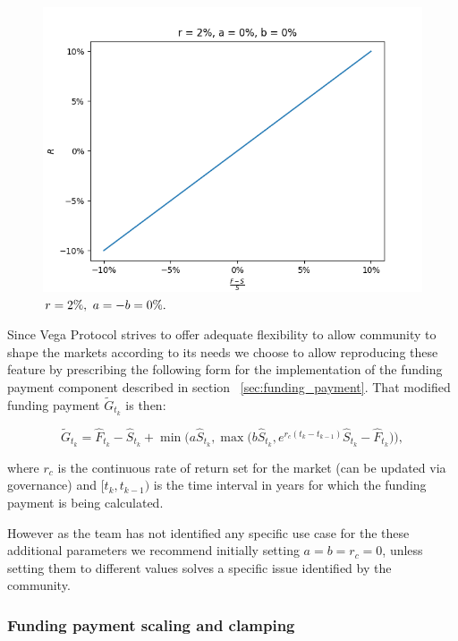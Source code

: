 \documentclass[10pt]{article}
\begin{document}
\begin{figure}[!htb]
  \includegraphics[width=\linewidth]{./plots/r_0.02_a_0_b_0_c_inf_d_-inf_k_1.png}
  \caption{$\\r=2\%,\ a=-b=0\%.$}\label{fig:clamp3}
\endminipage
\end{figure}

Since Vega Protocol strives to offer adequate flexibility to allow community to shape the markets according to its needs we choose to allow reproducing these feature by prescribing the following form for the implementation of the funding payment component described in section ~\ref{sec:funding_payment}. That modified funding payment $\tilde G_{t_k}$ is then:

\begin{equation}\label{eqn:modified_funding_payment}
\tilde G_{t_k} = \hat F_{t_k} - \hat S_{t_k} + \min \Bigg (a\hat S_{t_k},\max \bigg(b\hat S_{t_k}, e^{r_c(t_k-t_{k-1})} \hat S_{t_k} - \hat F_{t_k} \bigg ) \Bigg ), 
\end{equation}

where $r_c$ is the continuous rate of return set for the market (can be updated via governance) and $[t_k,t_{k-1})$ is the time interval in years for which the funding payment is being calculated.

However as the team has not identified any specific use case for the these additional parameters we recommend initially setting $a=b=r_c=0$, unless setting them to different values solves a specific issue identified by the community.

\subsubsection{Funding payment scaling and clamping}
\end{document}
